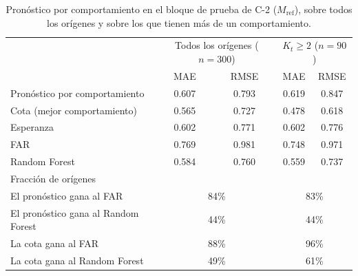 \begin{table}[H]
\centering\small
\caption{Pronóstico por comportamiento en el bloque de prueba de C-2 ($M_{\mathrm{ref}}$), sobre todos los orígenes y sobre los que tienen más de un comportamiento.}
\label{tab:res_pronostico}
\begin{tabular}{l cc cc}
\hline
 & \multicolumn{2}{c}{Todos los orígenes ($n = 300$)} & \multicolumn{2}{c}{$K_t \ge 2$ ($n = 90$)} \\
 & MAE & RMSE & MAE & RMSE \\
\hline
Pronóstico por comportamiento  & 0.607 & 0.793 & 0.619 & 0.847 \\
Cota (mejor comportamiento)    & 0.565 & 0.727 & 0.478 & 0.618 \\
Esperanza                      & 0.602 & 0.771 & 0.602 & 0.776 \\
FAR                            & 0.769 & 0.981 & 0.748 & 0.971 \\
Random Forest                  & 0.584 & 0.760 & 0.559 & 0.737 \\
\hline
\multicolumn{5}{l}{Fracción de orígenes} \\
El pronóstico gana al FAR            & \multicolumn{2}{c}{84\%} & \multicolumn{2}{c}{83\%} \\
El pronóstico gana al Random Forest  & \multicolumn{2}{c}{44\%} & \multicolumn{2}{c}{44\%} \\
La cota gana al FAR                  & \multicolumn{2}{c}{88\%} & \multicolumn{2}{c}{96\%} \\
La cota gana al Random Forest        & \multicolumn{2}{c}{49\%} & \multicolumn{2}{c}{61\%} \\
\hline
\end{tabular}
\end{table}

